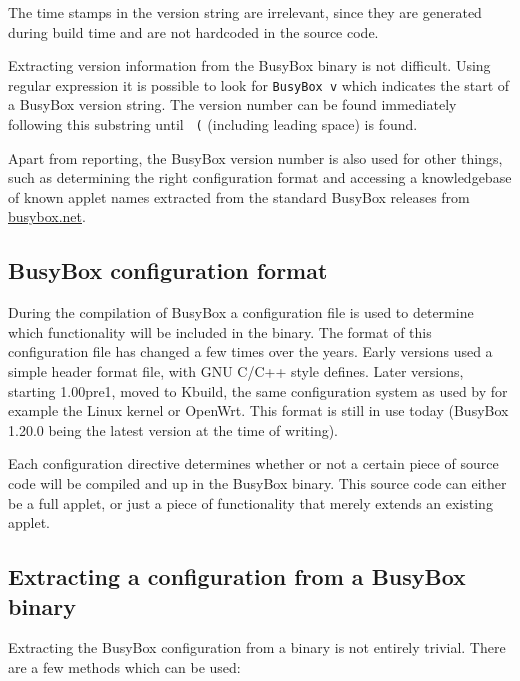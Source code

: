 \documentclass[10pt]{article}
\begin{document}
The time stamps in the version string are irrelevant, since they are generated
during build time and are not hardcoded in the source code.

Extracting version information from the BusyBox binary is not difficult.
Using regular expression it is possible to look for \texttt{BusyBox v} which
indicates the start of a BusyBox version string. The version number can be
found immediately following this substring until \texttt{ (} (including
leading space) is found.

Apart from reporting, the BusyBox version number is also used for other
things, such as determining the right configuration format and accessing a
knowledgebase of known applet names extracted from the standard BusyBox
releases from \url{busybox.net}.

\subsection{BusyBox configuration format}

During the compilation of BusyBox a configuration file is used to determine
which functionality will be included in the binary. The format of this
configuration file has changed a few times over the years. Early versions used
a simple header format file, with GNU C/C++ style defines. Later versions,
starting 1.00pre1, moved to Kbuild, the same configuration system as used by
for example the Linux kernel or OpenWrt. This format is still in use today
(BusyBox 1.20.0 being the latest version at the time of writing).

Each configuration directive determines whether or not a certain piece of
source code will be compiled and up in the BusyBox binary. This source code can
either be a full applet, or just a piece of functionality that merely extends
an existing applet.

\subsection{Extracting a configuration from a BusyBox binary}

Extracting the BusyBox configuration from a binary is not entirely trivial.
There are a few methods which can be used:
\end{document}
